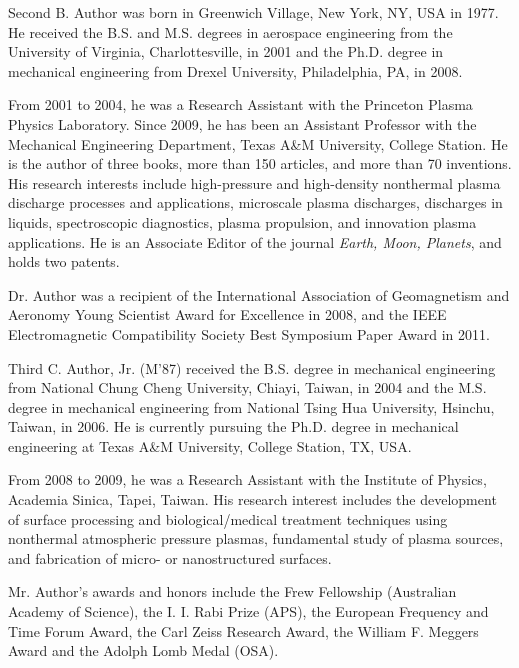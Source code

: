 \documentclass[journal,twoside,web]{ieeecolor}
\begin{document}
\begin{IEEEbiography}{Second B. Author} was born in Greenwich Village, New York, NY, USA in 
1977. He received the B.S. and M.S. degrees in aerospace engineering from 
the University of Virginia, Charlottesville, in 2001 and the Ph.D. degree in 
mechanical engineering from Drexel University, Philadelphia, PA, in 2008.

From 2001 to 2004, he was a Research Assistant with the Princeton Plasma 
Physics Laboratory. Since 2009, he has been an Assistant Professor with the 
Mechanical Engineering Department, Texas A{\&}M University, College Station. 
He is the author of three books, more than 150 articles, and more than 70 
inventions. His research interests include high-pressure and high-density 
nonthermal plasma discharge processes and applications, microscale plasma 
discharges, discharges in liquids, spectroscopic diagnostics, plasma 
propulsion, and innovation plasma applications. He is an Associate Editor of 
the journal \emph{Earth, Moon, Planets}, and holds two patents. 

Dr. Author was a recipient of the International Association of Geomagnetism 
and Aeronomy Young Scientist Award for Excellence in 2008, and the IEEE 
Electromagnetic Compatibility Society Best Symposium Paper Award in 2011. 
\end{IEEEbiography}

\begin{IEEEbiography}{Third C. Author, Jr.} (M'87) received the B.S. degree in mechanical 
engineering from National Chung Cheng University, Chiayi, Taiwan, in 2004 
and the M.S. degree in mechanical engineering from National Tsing Hua 
University, Hsinchu, Taiwan, in 2006. He is currently pursuing the Ph.D. 
degree in mechanical engineering at Texas A{\&}M University, College 
Station, TX, USA.

From 2008 to 2009, he was a Research Assistant with the Institute of 
Physics, Academia Sinica, Tapei, Taiwan. His research interest includes the 
development of surface processing and biological/medical treatment 
techniques using nonthermal atmospheric pressure plasmas, fundamental study 
of plasma sources, and fabrication of micro- or nanostructured surfaces. 

Mr. Author's awards and honors include the Frew Fellowship (Australian 
Academy of Science), the I. I. Rabi Prize (APS), the European Frequency and 
Time Forum Award, the Carl Zeiss Research Award, the William F. Meggers 
Award and the Adolph Lomb Medal (OSA).
\end{IEEEbiography}
\end{document}
